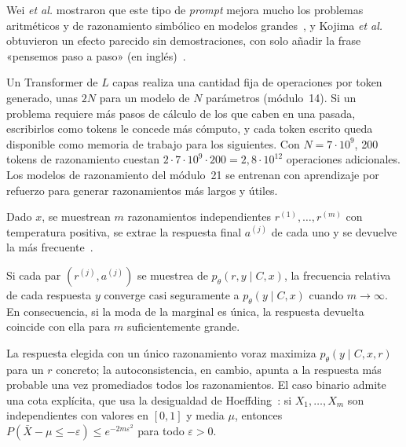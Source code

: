 Wei \emph{et al.} mostraron que este tipo de \emph{prompt} mejora mucho los problemas aritméticos y de razonamiento simbólico en modelos grandes~\cite{wei-cot}, y Kojima \emph{et al.} obtuvieron un efecto parecido sin demostraciones, con solo añadir la frase «pensemos paso a paso» (en inglés)~\cite{kojima}.

\begin{observacion}\label{obs:computo}
Un Transformer de $L$ capas realiza una cantidad fija de operaciones por token generado, unas $2N$ para un modelo de $N$ parámetros (módulo~14). Si un problema requiere más pasos de cálculo de los que caben en una pasada, escribirlos como tokens le concede más cómputo, y cada token escrito queda disponible como memoria de trabajo para los siguientes. Con $N=7\cdot 10^{9}$, 200 tokens de razonamiento cuestan $2\cdot 7\cdot 10^{9}\cdot 200=2{,}8\cdot 10^{12}$ operaciones adicionales. Los modelos de razonamiento del módulo~21 se entrenan con aprendizaje por refuerzo para generar razonamientos más largos y útiles.
\end{observacion}

\begin{definicion}[Autoconsistencia]\label{def:sc}
Dado $x$, se muestrean $m$ razonamientos independientes $r^{(1)},\dots,r^{(m)}$ con temperatura positiva, se extrae la respuesta final $a^{(j)}$ de cada uno y se devuelve la más frecuente~\cite{wang-sc}.
\end{definicion}

\begin{proposicion}\label{prop:sc-moda}
Si cada par $(r^{(j)},a^{(j)})$ se muestrea de $p_\theta(r,y\mid C,x)$, la frecuencia relativa de cada respuesta $y$ converge casi seguramente a $p_\theta(y\mid C,x)$ cuando $m\to\infty$. En consecuencia, si la moda de la marginal es única, la respuesta devuelta coincide con ella para $m$ suficientemente grande.
\end{proposicion}

La respuesta elegida con un único razonamiento voraz maximiza $p_\theta(y\mid C,x,r)$ para un $r$ concreto; la autoconsistencia, en cambio, apunta a la respuesta más probable una vez promediados todos los razonamientos. El caso binario admite una cota explícita, que usa la desigualdad de Hoeffding~\cite{hoeffding}: si $X_1,\dots,X_m$ son independientes con valores en $[0,1]$ y media $\mu$, entonces $P(\bar X-\mu\le -\varepsilon)\le e^{-2m\varepsilon^{2}}$ para todo $\varepsilon>0$.


